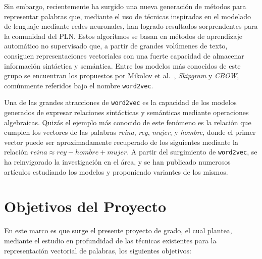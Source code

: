 Sin embargo, recientemente ha surgido una nueva generación de métodos para representar palabras
que, mediante el uso de técnicas inspiradas en el modelado de lenguaje mediante redes neuronales,
han logrado resultados sorprendentes para la comunidad del PLN\@. Estos algoritmos se basan en métodos
de aprendizaje automático no supervisado que, a partir de grandes volúmenes de texto, consiguen
representaciones vectoriales con una fuerte capacidad de almacenar información sintáctica y
semántica. Entre los modelos más conocidos de este grupo se encuentran los propuestos por Mikolov et
al.~\cite{Mikolov2013a, Mikolov2013b, Mikolov2013c}, \textit{Skipgram} y \textit{CBOW}, comúnmente
referidos bajo el nombre \texttt{word2vec}.

Una de las grandes atracciones de \texttt{word2vec} es la capacidad de los modelos generados de
expresar relaciones sintácticas y semánticas mediante operaciones algebraicas. Quizás el ejemplo más
conocido de este fenómeno es la relación que cumplen los vectores de las palabras \textit{reina},
\textit{rey}, \textit{mujer}, y \textit{hombre}, donde el primer vector puede ser aproximadamente
recuperado de los siguientes mediante la relación $reina \approx rey - hombre + mujer$. A partir del
surgimiento de \texttt{word2vec}, se ha reinvigorado la investigación en el área, y se han publicado
numerosos artículos estudiando los modelos y proponiendo variantes de los mismos.


\section{Objetivos del Proyecto}

En este marco es que surge el presente proyecto de grado, el cual plantea, mediante el estudio en
profundidad de las técnicas existentes para la representación vectorial de palabras, los siguientes
objetivos:

